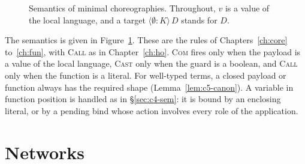 \documentclass[11pt]{report}
\makeatletter
\theoremstyle{plain}
\theoremstyle{definition}
\theoremstyle{remark}
\newcommand{\kw}[1]{\mathsf{#1}}
\newcommand{\pp}{\mathsf{p}}
\newcommand{\qq}{\mathsf{q}}
\newcommand{\rr}{\mathsf{r}}
\newcommand{\ttrue}{\kw{tt}}
\newcommand{\ffalse}{\kw{ff}}
\newcommand{\bind}[3]{#1 \leftarrow #2\,;\;#3}
\newcommand{\com}[3]{#1.#2 \to #3}
\newcommand{\cif}[4]{\kw{if}\;#1.#2\;\kw{then}\;#3\;\kw{else}\;#4}
\newcommand{\mbind}[3]{#1 \mathbin{>\!\!>\!\!=} #2.\,#3}
\newcommand{\rt}[3]{\langle #1 : #2\rangle\,#3}
\newcommand{\unfold}[1]{\mathrm{unfold}(#1)}
\newcommand{\roles}[1]{\mathrm{roles}(#1)}
\newcommand{\rcv}[1]{\mathrm{rcv}(#1)}
\newcommand{\tauat}[1]{\tau\mathord{@}#1}
\newcommand{\castlbl}[3]{#1.#2 \rightsquigarrow #3}
\newcommand{\lto}[1]{\xrightarrow{\;#1\;}}
\newcommand{\rn}[1]{{\normalfont\scshape #1}}
\makeatother
\begin{document}
\begin{figure}[t]
\caption{Semantics of minimal choreographies.  Throughout, $v$ is a value of
  the local language, and a target $\rt{\emptyset}{K}{D}$ stands for $D$.}
\label{fig:c5-sem}
\end{figure}

The semantics is given in Figure~\ref{fig:c5-sem}.  These are the rules of
Chapters~\ref{ch:core} to~\ref{ch:fun}, with \rn{Call} as in
Chapter~\ref{ch:ho}.  \rn{Com} fires only when the payload is a value of the
local language, \rn{Cast} only when the guard is a boolean, and \rn{Call}
only when the function is a literal.  For well-typed terms, a closed payload
or function always has the required shape (Lemma~\ref{lem:c5-canon}).  A
variable in function position is handled as in \S\ref{sec:c4-sem}: it is
bound by an enclosing literal, or by a pending bind whose action involves
every role of the application.

\section{Networks}
\label{sec:c5-net}
\end{document}
